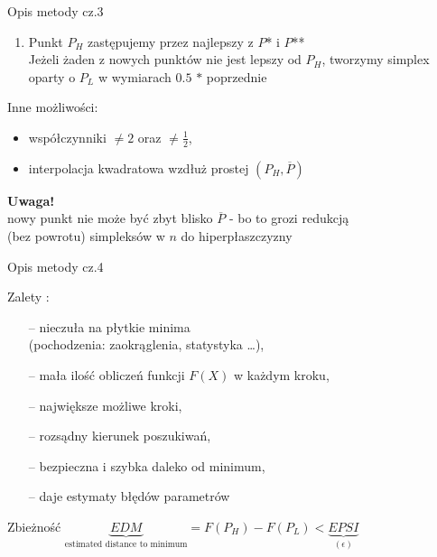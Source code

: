   \begin{frame}{Opis metody cz.3}

	\begin{enumerate}
		\setcounter{enumi}{\value{saveenumi}}
		\item Punkt $P_H$ zastępujemy przez najlepszy z $P$* i $P$**
		\smallskip
		\\Jeżeli żaden z nowych punktów nie jest lepszy od $P_H$, tworzymy simplex oparty o $P_L$ w wymiarach $0.5$ $*$ poprzednie
	\end{enumerate}
	Inne możliwości:
	\begin{itemize}
		\item współczynniki $\neq 2$ oraz $\neq \frac{1}{2}$,
		\item interpolacja kwadratowa wzdłuż prostej $(P_H,\overline{P})$
	\end{itemize}
	\begin{block}{}
	  	\textbf{Uwaga!}
 	  	\\nowy punkt nie może być zbyt blisko $\overline{P}$ - bo to grozi redukcją
 	  	\\(bez powrotu) simpleksów w $n$ do hiperpłaszczyzny
    \end{block}

  \end{frame}

  \begin{frame}{Opis metody cz.4}

	\begin{block}{Zalety :}
	  	\begin{itemize}
	  		\item[--] nieczuła na płytkie minima
	  		\\(pochodzenia: zaokrąglenia, statystyka \ldots),
	  		\item[--] mała ilość obliczeń funkcji $F(X)$ w każdym kroku,
	  		\item[--] największe możliwe kroki,
	  		\item[--] rozsądny kierunek poszukiwań,
	  		\item[--] bezpieczna i szybka daleko od minimum,
	  		\item[--] daje estymaty błędów parametrów
	  	\end{itemize}
    \end{block}
    \begin{block}{Zbieżność}
	  	$\underbrace{EDM}_{ \text{estimated distance to minimum}} = F(P_H) - F(P_L) < \underbrace{EPSI}_{(\epsilon)}$
    \end{block}

  \end{frame}

